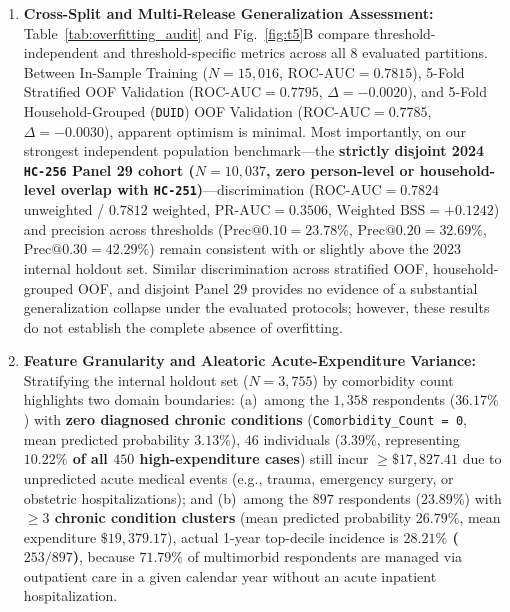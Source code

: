 \documentclass[runningheads]{llncs}
\begin{document}
\begin{enumerate}
    \item \textbf{Cross-Split and Multi-Release Generalization Assessment:} Table~\ref{tab:overfitting_audit} and Fig.~\ref{fig:t5}B compare threshold-independent and threshold-specific metrics across all 8 evaluated partitions. Between In-Sample Training ($N=15,016$, $\text{ROC-AUC} = 0.7815$), 5-Fold Stratified OOF Validation ($\text{ROC-AUC} = 0.7795$, $\Delta = -0.0020$), and 5-Fold Household-Grouped (\texttt{DUID}) OOF Validation ($\text{ROC-AUC} = 0.7785$, $\Delta = -0.0030$), apparent optimism is minimal. Most importantly, on our strongest independent population benchmark---the \textbf{strictly disjoint 2024 \texttt{HC-256} Panel 29 cohort ($N=10,037$, zero person-level or household-level overlap with \texttt{HC-251})}---discrimination ($\text{ROC-AUC} = 0.7824$ unweighted / $0.7812$ weighted, $\text{PR-AUC} = 0.3506$, $\text{Weighted BSS} = +0.1242$) and precision across thresholds ($\text{Prec@0.10} = 23.78\%$, $\text{Prec@0.20} = 32.69\%$, $\text{Prec@0.30} = 42.29\%$) remain consistent with or slightly above the 2023 internal holdout set. Similar discrimination across stratified OOF, household-grouped OOF, and disjoint Panel 29 provides no evidence of a substantial generalization collapse under the evaluated protocols; however, these results do not establish the complete absence of overfitting.
    \item \textbf{Feature Granularity and Aleatoric Acute-Expenditure Variance:} Stratifying the internal holdout set ($N=3,755$) by comorbidity count highlights two domain boundaries: (a)~among the $1,358$ respondents ($36.17\%$) with \textbf{zero diagnosed chronic conditions} (\texttt{Comorbidity\_Count = 0}, mean predicted probability $3.13\%$), $46$ individuals ($3.39\%$, representing \textbf{$10.22\%$ of all $450$ high-expenditure cases}) still incur $\ge \$17,827.41$ due to unpredicted acute medical events (e.g., trauma, emergency surgery, or obstetric hospitalizations); and (b)~among the $897$ respondents ($23.89\%$) with \textbf{$\ge 3$ chronic condition clusters} (mean predicted probability $26.79\%$, mean expenditure $\$19,379.17$), actual 1-year top-decile incidence is \textbf{$28.21\%$ ($253 / 897$)}, because $71.79\%$ of multimorbid respondents are managed via outpatient care in a given calendar year without an acute inpatient hospitalization.
\end{enumerate}
\end{document}
